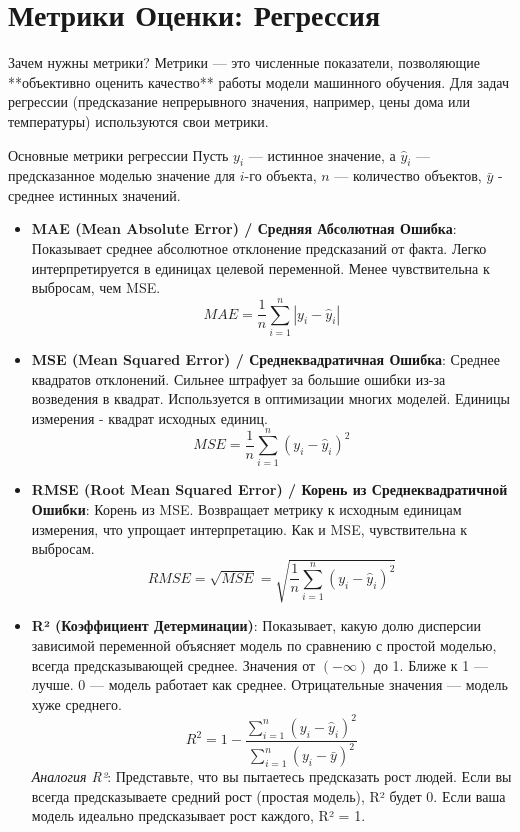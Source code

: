 
\section{Метрики Оценки: Регрессия}

\begin{myblock}{Зачем нужны метрики?}
    Метрики — это численные показатели, позволяющие **объективно оценить качество** работы модели машинного обучения. Для задач регрессии (предсказание непрерывного значения, например, цены дома или температуры) используются свои метрики.
\end{myblock}

\begin{textbox}{Основные метрики регрессии}
    Пусть $y_i$ — истинное значение, а $\hat{y}_i$ — предсказанное моделью значение для $i$-го объекта, $n$ — количество объектов, $\bar{y}$ - среднее истинных значений.
    \begin{itemize}
        \item \textbf{MAE (Mean Absolute Error) / Средняя Абсолютная Ошибка}: Показывает среднее абсолютное отклонение предсказаний от факта. Легко интерпретируется в единицах целевой переменной. Менее чувствительна к выбросам, чем MSE.
            \[ MAE = \frac{1}{n} \sum_{i=1}^{n} |y_i - \hat{y}_i| \]
        \item \textbf{MSE (Mean Squared Error) / Среднеквадратичная Ошибка}: Среднее квадратов отклонений. Сильнее штрафует за большие ошибки из-за возведения в квадрат. Используется в оптимизации многих моделей. Единицы измерения - квадрат исходных единиц.
            \[ MSE = \frac{1}{n} \sum_{i=1}^{n} (y_i - \hat{y}_i)^2 \]
        \item \textbf{RMSE (Root Mean Squared Error) / Корень из Среднеквадратичной Ошибки}: Корень из MSE. Возвращает метрику к исходным единицам измерения, что упрощает интерпретацию. Как и MSE, чувствительна к выбросам.
            \[ RMSE = \sqrt{MSE} = \sqrt{\frac{1}{n} \sum_{i=1}^{n} (y_i - \hat{y}_i)^2} \]
        \item \textbf{R² (Коэффициент Детерминации)}: Показывает, какую долю дисперсии зависимой переменной объясняет модель по сравнению с простой моделью, всегда предсказывающей среднее. Значения от $(-\infty)$ до 1. Ближе к 1 — лучше. 0 — модель работает как среднее. Отрицательные значения — модель хуже среднего.
            \[ R^2 = 1 - \frac{\sum_{i=1}^{n} (y_i - \hat{y}_i)^2}{\sum_{i=1}^{n} (y_i - \bar{y})^2} \]
            \textit{Аналогия R²}: Представьте, что вы пытаетесь предсказать рост людей. Если вы всегда предсказываете средний рост (простая модель), R² будет 0. Если ваша модель идеально предсказывает рост каждого, R² = 1.
    \end{itemize}
\end{textbox}

